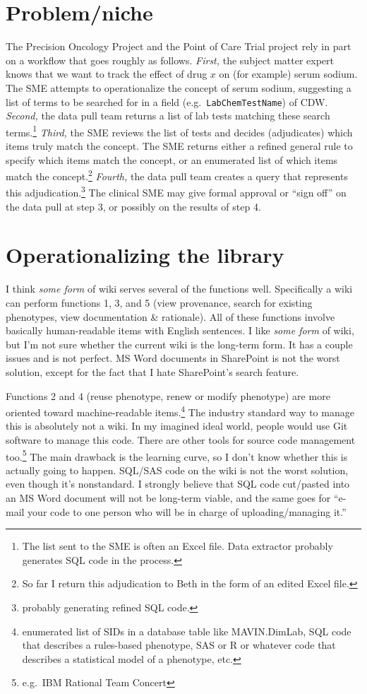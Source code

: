 \documentclass{tufte-handout}
\begin{document}
\section{Problem/niche}

The Precision Oncology Project and the Point of Care Trial project
rely in part on a workflow that goes roughly as follows. \emph{First,}
the subject matter expert knows that we want to track the effect of
drug $x$ on (for example) serum sodium. The SME attempts to
operationalize the concept of serum sodium, suggesting a list of terms
to be searched for in a field (e.g.\ \texttt{LabChemTestName}) of CDW.
\emph{Second,} the data pull team returns a list of lab tests matching
these search terms.\footnote{The list sent to the SME is often an
  Excel file. Data extractor probably generates SQL code in the
  process.} \emph{Third,} the SME reviews the list of tests and
decides (adjudicates) which items truly match the concept. The SME
returns either a refined general rule to specify which items match the
concept, or an enumerated list of which items match the
concept.\footnote{So far I return this adjudication to Beth in the
  form of an edited Excel file.} \emph{Fourth,} the data pull team
creates a query that represents this adjudication.\footnote{probably
  generating refined SQL code.} The clinical SME may give formal
approval or ``sign off'' on the data pull at step 3, or possibly on
the results of step 4.

\section{Operationalizing the library}

I think \emph{some form} of wiki serves several of the functions well.
Specifically a wiki can perform functions 1, 3, and 5 (view
provenance, search for existing phenotypes, view documentation \&
rationale). All of these functions involve basically human-readable
items with English sentences. I like \emph{some form} of wiki, but I'm
not sure whether the current wiki is the long-term form. It has a
couple issues and is not perfect. MS Word documents in SharePoint is
not the worst solution, except for the fact that I hate SharePoint's
search feature.

Functions 2 and 4 (reuse phenotype, renew or modify phenotype) are
more oriented toward machine-readable items.\footnote{enumerated list of SIDs
in a database table like MAVIN.DimLab, SQL code that describes a
rules-based phenotype, SAS or R or whatever code that describes a
statistical model of a phenotype, etc.} The industry standard way to
manage this is absolutely not a wiki. In my imagined ideal world,
people would use Git software to manage this code. There are other
tools for source code management too.\footnote{e.g.\ IBM Rational Team Concert}
The main drawback is the learning curve, so I don't know whether this
is actually going to happen. SQL/SAS code on the wiki is not the worst
solution, even though it's nonstandard. I strongly believe that SQL
code cut/pasted into an MS Word document will not be long-term viable,
and the same goes for ``e-mail your code to one person who will be in
charge of uploading/managing it.''
\end{document}
